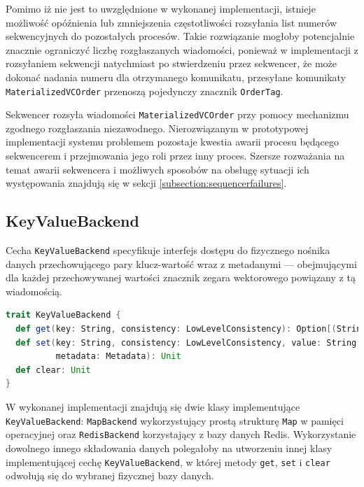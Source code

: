 Pomimo iż nie jest to uwzględnione w wykonanej implementacji, istnieje możliwość opóźnienia lub zmniejszenia częstotliwości rozsyłania list numerów sekwencyjnych do pozostałych procesów. Takie rozwiązanie mogłoby potencjalnie znacznie ograniczyć liczbę rozgłaszanych wiadomości, ponieważ w implementacji z rozsyłaniem sekwencji natychmiast po stwierdzeniu przez sekwencer, że może dokonać nadania numeru dla otrzymanego komunikatu, przesyłane komunikaty \texttt{MaterializedVCOrder} przenoszą pojedynczy znacznik \texttt{OrderTag}.

Sekwencer rozsyła wiadomości \texttt{MaterializedVCOrder} przy pomocy mechanizmu zgodnego rozgłaszania niezawodnego. Nierozwiązanym w prototypowej implementacji systemu problemem pozostaje kwestia awarii procesu będącego sekwencerem i przejmowania jego roli przez inny proces. Szersze rozważania na temat awarii sekwencera i możliwych sposobów na obsługę sytuacji ich występowania znajdują się w sekcji \ref{subsection:sequencerfailures}.

\subsection{KeyValueBackend} \label{subsection:backend}

Cecha \texttt{KeyValueBackend} specyfikuje interfejs dostępu do fizycznego nośnika danych przechowującego pary klucz-wartość wraz z metadanymi --- obejmującymi dla każdej przechowywanej wartości znacznik zegara wektorowego powiązany z tą wiadomością.

\begin{lstlisting}[language=Scala,caption=Definicja cechy KeyValueBackend]
trait KeyValueBackend {
  def get(key: String, consistency: LowLevelConsistency): Option[(String, Metadata)]
  def set(key: String, consistency: LowLevelConsistency, value: String,
          metadata: Metadata): Unit
  def clear: Unit
}
\end{lstlisting}

W wykonanej implementacji znajdują się dwie klasy implementujące \texttt{KeyValueBackend}: \texttt{MapBackend} wykorzystujący prostą strukturę \texttt{Map} w pamięci operacyjnej oraz \texttt{RedisBackend} korzystający z bazy danych Redis. Wykorzystanie dowolnego innego składowania danych polegałoby na utworzeniu innej klasy implementującej cechę \texttt{KeyValueBackend}, w której metody \texttt{get}, \texttt{set} i \texttt{clear} odwołują się do wybranej fizycznej bazy danych.

